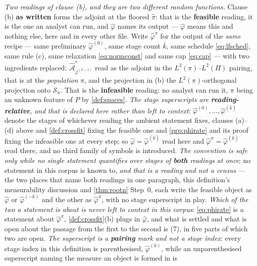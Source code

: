 \begin{definition}
\emph{Two readings of clause \textup{(b)}, and they are two different random functions.} Clause
\textup{(b)} \textbf{as written} forms the adjoint at the floored $\hat\pi$: that is the
\textbf{feasible} reading, it is the one an analyst can run, and $\hat\varphi$ names its output ---
$\hat\varphi$ means this and nothing else, here and in every other file.
Write $\hat\varphi^{\pi}$ for the output of the \emph{same} recipe --- same preliminary
$\hat\varphi^{(0)}$, same stage count $\bar k$, same schedule \eqref{eq:lfsched}, same rule
\textup{(c)}, same relaxation \eqref{eq:normconst} and same cap \eqref{eq:cap} --- with two ingredients
replaced: $\hat{\mathcal A}^\ast_{\hat\varphi^{(k-1)}}$ read as the adjoint in the
$L^{2}(\pi)$--$L^{2}(\Pi)$ pairing, that is  at the \emph{population} $\pi$, and the
projection in \textup{(b)} the $L^{2}(\pi)$-orthogonal projection onto $\mathcal S_n$. That is the
\textbf{infeasible} reading: no analyst can run it, $\pi$ being an unknown feature of $P$ by
\cref{def:spaces}. \emph{The stage superscripts are \textbf{reading-relative}, and that is declared here
rather than left to context}: $\hat\varphi^{(0)},\dots,\hat\varphi^{(\bar k)}$ denote the stages of
whichever reading the ambient statement fixes, clauses \textup{(a)}--\textup{(d)} above and
\cref{def:crossfit} fixing the feasible one and \cref{prp:phirate} and its proof fixing the infeasible
one at every step; so $\hat\varphi=\hat\varphi^{(\bar k)}$ read here and
$\hat\varphi^{\pi}=\hat\varphi^{(\bar k)}$ read there, and no third family of symbols is introduced.
\emph{The convention is safe only while no single statement quantifies over stages of \textbf{both}
readings at once}; no statement in this corpus is known to, \emph{and that is a reading and not a
census} --- the two places that name both readings in one paragraph, this definition's measurability
discussion and \cref{thm:rootn} Step~0, each write the feasible object as $\hat\varphi$ or
$\hat\varphi^{(-k)}$ and the other as $\hat\varphi^{\pi}$, with no stage superscript in play.
\emph{Which of the two a statement is about is never left to context in this corpus}:
\eqref{eq:phirate} is a statement about $\hat\varphi^{\pi}$, \cref{def:crossfit}\textup{(b)} plugs in
$\hat\varphi$, and what is settled and what is open about the passage from the first to the second is
\textup{(7)}, in five parts of which two are open. \emph{The superscript is a
\textbf{pairing} mark and not a stage index}: every stage index in this definition is parenthesised,
$\hat\varphi^{(k)}$, while an unparenthesised superscript naming the measure an object is formed in is

\end{definition}
